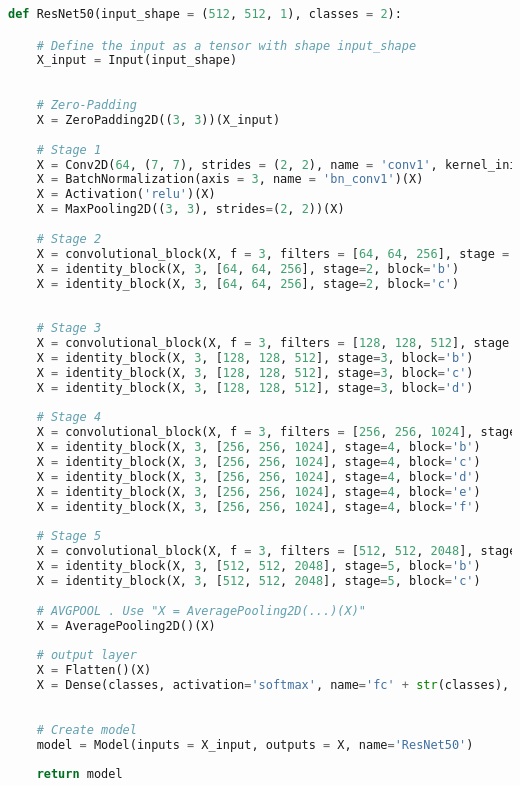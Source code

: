 \begin{lstlisting}[language=Python]
def ResNet50(input_shape = (512, 512, 1), classes = 2):

	# Define the input as a tensor with shape input_shape
	X_input = Input(input_shape)
	
	
	# Zero-Padding
	X = ZeroPadding2D((3, 3))(X_input)
	
	# Stage 1
	X = Conv2D(64, (7, 7), strides = (2, 2), name = 'conv1', kernel_initializer = glorot_uniform(seed=0))(X)
	X = BatchNormalization(axis = 3, name = 'bn_conv1')(X)
	X = Activation('relu')(X)
	X = MaxPooling2D((3, 3), strides=(2, 2))(X)
	
	# Stage 2
	X = convolutional_block(X, f = 3, filters = [64, 64, 256], stage = 2, block='a', s = 1)
	X = identity_block(X, 3, [64, 64, 256], stage=2, block='b')
	X = identity_block(X, 3, [64, 64, 256], stage=2, block='c')
	
	
	# Stage 3 
	X = convolutional_block(X, f = 3, filters = [128, 128, 512], stage = 3, block='a', s = 2)
	X = identity_block(X, 3, [128, 128, 512], stage=3, block='b')
	X = identity_block(X, 3, [128, 128, 512], stage=3, block='c')
	X = identity_block(X, 3, [128, 128, 512], stage=3, block='d')
	
	# Stage 4 
	X = convolutional_block(X, f = 3, filters = [256, 256, 1024], stage = 4, block='a', s = 2)
	X = identity_block(X, 3, [256, 256, 1024], stage=4, block='b')
	X = identity_block(X, 3, [256, 256, 1024], stage=4, block='c')
	X = identity_block(X, 3, [256, 256, 1024], stage=4, block='d')
	X = identity_block(X, 3, [256, 256, 1024], stage=4, block='e')
	X = identity_block(X, 3, [256, 256, 1024], stage=4, block='f')
	
	# Stage 5 
	X = convolutional_block(X, f = 3, filters = [512, 512, 2048], stage = 5, block='a', s = 2)
	X = identity_block(X, 3, [512, 512, 2048], stage=5, block='b')
	X = identity_block(X, 3, [512, 512, 2048], stage=5, block='c')
	
	# AVGPOOL . Use "X = AveragePooling2D(...)(X)"
	X = AveragePooling2D()(X)
	
	# output layer
	X = Flatten()(X)
	X = Dense(classes, activation='softmax', name='fc' + str(classes), kernel_initializer = glorot_uniform(seed=0))(X)
	
	
	# Create model
	model = Model(inputs = X_input, outputs = X, name='ResNet50')
	
	return model
\end{lstlisting}